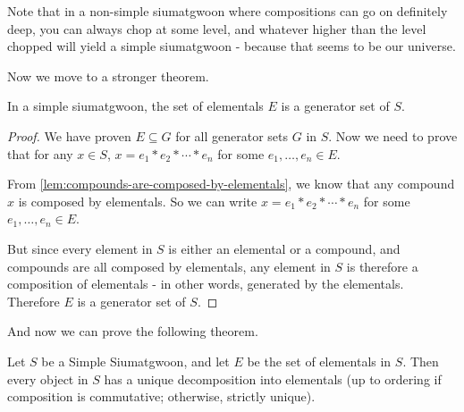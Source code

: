 Note that in a non-simple siumatgwoon where compositions can go on definitely deep, you can always chop at some level, and whatever higher than the level chopped will yield a simple siumatgwoon - because that seems to be our universe. 


   



Now we move to a stronger theorem.

\begin{theorem}\label{thm:elementals-are-a-generator-set-in-simple-siumatgwoons} 
    In a simple siumatgwoon, the set of elementals $E$ is a generator set of $S$.
\end{theorem}

\begin{proof}
    We have proven $E\subseteq G$ for all generator sets $G$ in $S$. Now we need to prove that for any $x\in S$, $x = e_1 * e_2 * \cdots * e_n$ for some $e_1, \dots, e_n \in E$.

    From \ref{lem:compounds-are-composed-by-elementals}, we know that any compound $x$ is composed by elementals. So we can write $x = e_1 * e_2 * \cdots * e_n$ for some $e_1, \dots, e_n \in E$.

    But since every element in $S$ is either an elemental or a compound, and compounds are all composed by elementals, any element in $S$ is therefore a composition of elementals - in other words, generated by the elementals. Therefore $E$ is a generator set of $S$.
\end{proof}


And now we can prove the following theorem.
    
\begin{theorem}\label{thm:elementals-unique-decomposition}
    Let $S$ be a Simple Siumatgwoon, and let $E$ be the set of elementals in $S$. Then every object in $S$ has a unique decomposition into elementals (up to ordering if composition is commutative; otherwise, strictly unique).
\end{theorem}
    
